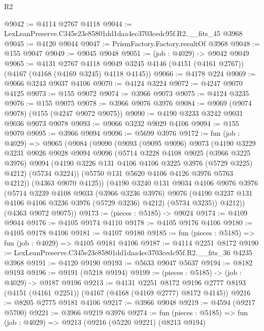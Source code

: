 \begin{lexlean}{R2}
\begin{coremodule}
@9042 := @4114 @2767 @4118
@9044 := LexLeanPreserve.C345e23e85801dd1daa4ec3703cedc95f.R2.__fits_45 @3968
@9045 := @4120 @9044
@9047 := PrismFactory.Factory.resultOf @3968
@9048 := @155 @9047
@9049 := @9045 @9048
@9051 := (job : @4029) -> @9042 @9049
@9065 := @4131
    @2767
    @4118
    @9049
    @3245
    @4146
    (@4151 (@4161 @2767))
    (@4167 (@4168 (@4169 @3245) @4118 @4145))
@9066 := @4178 @224
@9069 := @9066 @3243 @9037 @4106
@9070 := @4124 @3224
@9072 := @4247 @9070 @4125
@9073 := @155 @9072
@9074 := @3966 @9073
@9075 := @4124 @3235
@9076 := @155 @9075
@9078 := @3966 @9076 @3976
@9084 := @9069 (@9074 @9078) (@155 (@4247 @9072 @9075))
@9090 := @4190 @3233 @3242 @9031 @9036 @9073 @9078
@9093 := @9066 @3232 @9029 @4106
@9094 := @155 @9070
@9095 := @3966 @9094
@9096 := @5699 @3976
@9172 := fun (job : @4029) =>
  @9065
    (@9084
      (@9090
        (@9093
          (@9095 @9096)
          @9073
          (@4190
            @3229
            @3231
            @9026
            @9028
            @9094
            @9096
            (@5714
              @3228
              @4108
              @9025
              (@3966 @3225 @3976)
              @9094
              (@4190 @3226 @131 @4106 @4106 @3225 @3976 (@5729 @3225) @4212)
              (@5734 @3224))
            (@5750 @131 @5620 @4106 @4126 @3976 @5763 @4212))
          (@4363 @9070 @4125))
        (@4190
          @3240
          @131
          @9034
          @4106
          @9076
          @3976
          (@5714
            @3239
            @4108
            @9033
            (@3966 @3236 @3976)
            @9076
            (@4190 @3237 @131 @4106 @4106 @3236 @3976 (@5729 @3236) @4212)
            (@5734 @3235))
          @4212))
      (@4363 @9072 @9075))
@9173 := (pieces : @5185) -> @9024
@9174 := @4109 @9044
@9176 := @4105 @9174 @4110
@9178 := @4105 @9176 @4106
@9180 := @4105 @9178 @4106
@9181 := @4107 @9180
@9185 := fun (pieces : @5185) => fun (job : @4029) => @4105 @9181 @4106
@9187 := @4114 @2251 @8172
@9190 := LexLeanPreserve.C345e23e85801dd1daa4ec3703cedc95f.R2.__fits_36 @4235 @3968
@9191 := @4120 @9190
@9193 := @5633 @9047 @5637
@9194 := @8182 @9193
@9196 := @9191 (@5218 @9194)
@9199 := (pieces : @5185) -> (job : @4029) -> @9187 @9196
@9213 := @4131
    @2251
    @8172
    @9196
    @2777
    @8193
    (@4151 (@4161 @2251))
    (@4167 (@4168 (@4169 @2777) @8172 @4145))
@9216 := @8205 @2775 @9181 @4106
@9217 := @3966 @9048
@9219 := @4594 (@9217 @5700)
@9221 := @3966 @9219 @3976
@9274 := fun (pieces : @5185) =>
  fun (job : @4029) =>
  @9213
    (@9216
      (@5220 @9221)
      (@8213 @9194)

\end{coremodule}
\end{lexlean}
